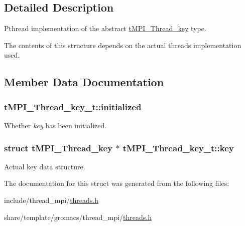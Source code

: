 \subsection{\-Detailed \-Description}
\-Pthread implementation of the abstract \hyperlink{structtMPI__Thread__key}{t\-M\-P\-I\-\_\-\-Thread\-\_\-key} type. 

\-The contents of this structure depends on the actual threads implementation used. 

\subsection{\-Member \-Data \-Documentation}
\hypertarget{structtMPI__Thread__key__t_a2f82d35de67d93bafa2f1aac13865c57}{
\subsubsection[{initialized}]{ {\bf t\-M\-P\-I\-\_\-\-Thread\-\_\-key\-\_\-t\-::initialized}}}\label{structtMPI__Thread__key__t_a2f82d35de67d93bafa2f1aac13865c57}
\-Whether {\itshape key\/} has been initialized. \hypertarget{structtMPI__Thread__key__t_a857a08ccbdce2b298a2e7abc2b7577b5}{
\subsubsection[{key}]{\setlength{\rightskip}{0pt plus 5cm}struct {\bf t\-M\-P\-I\-\_\-\-Thread\-\_\-key} $\ast$ {\bf t\-M\-P\-I\-\_\-\-Thread\-\_\-key\-\_\-t\-::key}}}\label{structtMPI__Thread__key__t_a857a08ccbdce2b298a2e7abc2b7577b5}
\-Actual key data structure. 

\-The documentation for this struct was generated from the following files\-:\begin{DoxyCompactItemize}
\item 
include/thread\-\_\-mpi/\hyperlink{include_2thread__mpi_2threads_8h}{threads.\-h}\item 
share/template/gromacs/thread\-\_\-mpi/\hyperlink{share_2template_2gromacs_2thread__mpi_2threads_8h}{threads.\-h}\end{DoxyCompactItemize}
